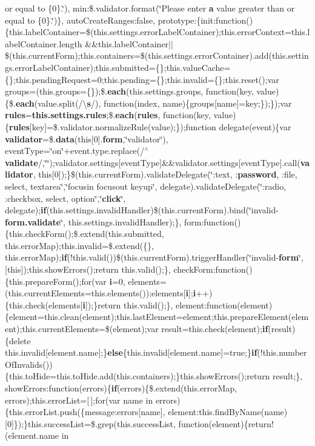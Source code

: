 {\begin{DoxyParamCaption}
or equal to \{0\}.\char`\"{}), min\+:\$.\+validator.\+format(\char`\"{}Please enter {\bf a} value greater than or equal to \{0\}.\char`\"{})\}, auto\+Create\+Ranges\+:false, prototype\+:\{init\+:function()\{this.\+label\+Container=\$(this.\+settings.\+error\+Label\+Container);this.\+error\+Context=this.\+label\+Container.\+length \&\&this.\+label\+Container$\vert$$\vert$\$(this.\+current\+Form);this.\+containers=\$(this.\+settings.\+error\+Container).add(this.\+settings.\+error\+Label\+Container);this.\+submitted=\{\};this.\+value\+Cache=\{\};this.\+pending\+Request=0;this.\+pending=\{\};this.\+invalid=\{\};this.\+reset();var groups=(this.\+groups=\{\});\$.{\bf each}(this.\+settings.\+groups, function(key, value)\{\$.{\bf each}(value.\+split(/\textbackslash{}{\bf s}/), function(index, name)\{groups\mbox{[}name\mbox{]}=key;\});\});var {\bf rules}={\bf this.\+settings.\+rules};\$.{\bf each}({\bf rules}, function(key, value)\{{\bf rules}\mbox{[}key\mbox{]}=\$.validator.\+normalize\+Rule(value);\});function delegate(event)\{var {\bf validator}=\$.{\bf data}(this\mbox{[}0\mbox{]}.{\bf form},\char`\"{}validator\char`\"{}), event\+Type=\char`\"{}on\char`\"{}+event.\+type.\+replace(/$^\wedge${\bf validate}/,\char`\"{}\char`\"{});validator.\+settings\mbox{[}event\+Type\mbox{]}\&\&validator.\+settings\mbox{[}event\+Type\mbox{]}.call({\bf validator}, this\mbox{[}0\mbox{]});\}\$(this.\+current\+Form).validate\+Delegate(\char`\"{}\+:text, \+:{\bf password}, \+:file, select, textarea\char`\"{},\char`\"{}focusin focusout keyup\char`\"{}, delegate).validate\+Delegate(\char`\"{}\+:radio, \+:checkbox, select, option\char`\"{},\char`\"{}{\bf click}\char`\"{}, delegate);{\bf if}(this.\+settings.\+invalid\+Handler)\$(this.\+current\+Form).bind(\char`\"{}invalid-\/{\bf form.\+validate}\char`\"{}, this.\+settings.\+invalid\+Handler);\}, form\+:function()\{this.\+check\+Form();\$.extend(this.\+submitted, this.\+error\+Map);this.\+invalid=\$.extend(\{\}, this.\+error\+Map);{\bf if}(!this.\+valid())\$(this.\+current\+Form).trigger\+Handler(\char`\"{}invalid-\/{\bf form}\char`\"{}, \mbox{[}this\mbox{]});this.\+show\+Errors();return this.\+valid();\}, check\+Form\+:function()\{this.\+prepare\+Form();for(var {\bf i}=0, elements=(this.\+current\+Elements=this.\+elements());elements\mbox{[}{\bf i}\mbox{]};{\bf i}++)\{this.\+check(elements\mbox{[}{\bf i}\mbox{]});\}return this.\+valid();\}, element\+:function(element)\{element=this.\+clean(element);this.\+last\+Element=element;this.\+prepare\+Element(element);this.\+current\+Elements=\$(element);var result=this.\+check(element);{\bf if}(result)\{delete this.\+invalid\mbox{[}element.\+name\mbox{]};\}{\bf else}\{this.\+invalid\mbox{[}element.\+name\mbox{]}=true;\}{\bf if}(!this.\+number\+Of\+Invalids())\{this.\+to\+Hide=this.\+to\+Hide.\+add(this.\+containers);\}this.\+show\+Errors();return result;\}, show\+Errors\+:function(errors)\{{\bf if}(errors)\{\$.extend(this.\+error\+Map, errors);this.\+error\+List=\mbox{[}$\,$\mbox{]};for(var name in errors)\{this.\+error\+List.\+push(\{message\+:errors\mbox{[}name\mbox{]}, element\+:this.\+find\+By\+Name(name)\mbox{[}0\mbox{]}\});\}this.\+success\+List=\$.grep(this.\+success\+List, function(element)\{return!(element.\+name in 
\end{DoxyParamCaption}}

